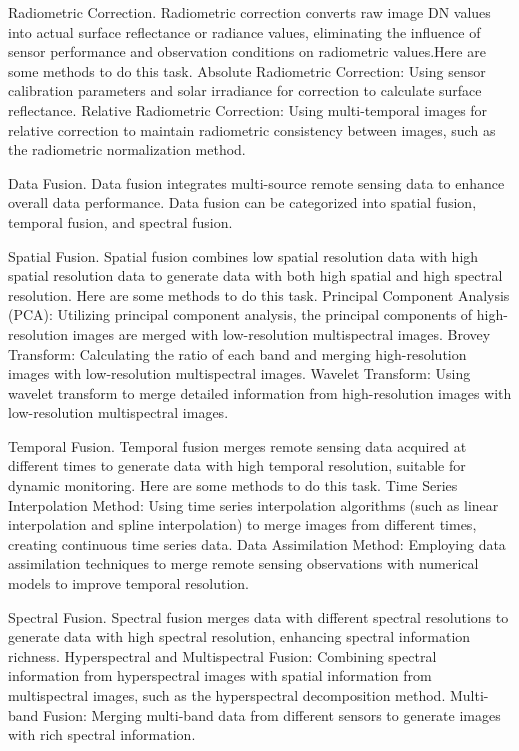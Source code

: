Radiometric Correction\cite{ulloAdvancesIoTSmart2021}.
Radiometric correction converts raw image DN values into actual surface reflectance or radiance values, eliminating the influence of sensor performance and observation conditions on radiometric values.Here are some methods to do this task.
Absolute Radiometric Correction: Using sensor calibration parameters and solar irradiance for correction to calculate surface reflectance.
Relative Radiometric Correction: Using multi-temporal images for relative correction to maintain radiometric consistency between images, such as the radiometric normalization method.

Data Fusion.
Data fusion integrates multi-source remote sensing data to enhance overall data performance. Data fusion can be categorized into spatial fusion, temporal fusion, and spectral fusion.

Spatial Fusion\cite{weissRemoteSensingAgricultural2020}.
Spatial fusion combines low spatial resolution data with high spatial resolution data to generate data with both high spatial and high spectral resolution. Here are some methods to do this task.
Principal Component Analysis (PCA): Utilizing principal component analysis, the principal components of high-resolution images are merged with low-resolution multispectral images.
Brovey Transform: Calculating the ratio of each band and merging high-resolution images with low-resolution multispectral images.
Wavelet Transform: Using wavelet transform to merge detailed information from high-resolution images with low-resolution multispectral images.

Temporal Fusion.
Temporal fusion merges remote sensing data acquired at different times to generate data with high temporal resolution, suitable for dynamic monitoring. Here are some methods to do this task\cite{huangAgriculturalRemoteSensing2018}.
Time Series Interpolation Method: Using time series interpolation algorithms (such as linear interpolation and spline interpolation) to merge images from different times, creating continuous time series data.
Data Assimilation Method: Employing data assimilation techniques to merge remote sensing observations with numerical models to improve temporal resolution.

Spectral Fusion.
Spectral fusion merges data with different spectral resolutions to generate data with high spectral resolution, enhancing spectral information richness.
Hyperspectral and Multispectral Fusion: Combining spectral information from hyperspectral images with spatial information from multispectral images, such as the hyperspectral decomposition method.
Multi-band Fusion: Merging multi-band data from different sensors to generate images with rich spectral information. 

